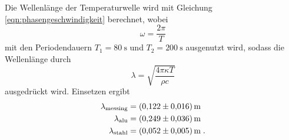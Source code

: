 Die Wellenlänge der Temperaturwelle wird mit Gleichung \eqref{eqn:phasengeschwindigkeit} berechnet, wobei
\begin{equation*}
  \omega=\frac{2\pi}{T}
\end{equation*}
mit den Periodendauern $T_1=\SI{80}{\second}$ und $T_2=\SI{200}{\second}$ ausgenutzt wird, sodass die Wellenlänge durch
\begin{equation*}
  \lambda=\sqrt{\frac{4\pi\kappa T}{\rho c}}
\end{equation*}
ausgedrückt wird. Einsetzen ergibt
\begin{align*}
\lambda_\text{messing} &=\SI{0.122\pm 0.016}{\metre}\\
\lambda_\text{alu}     &=\SI{0.249\pm 0.036}{\metre}\\
\lambda_\text{stahl}   &=\SI{0.052\pm 0.005}{\metre}   \;.
\end{align*}
